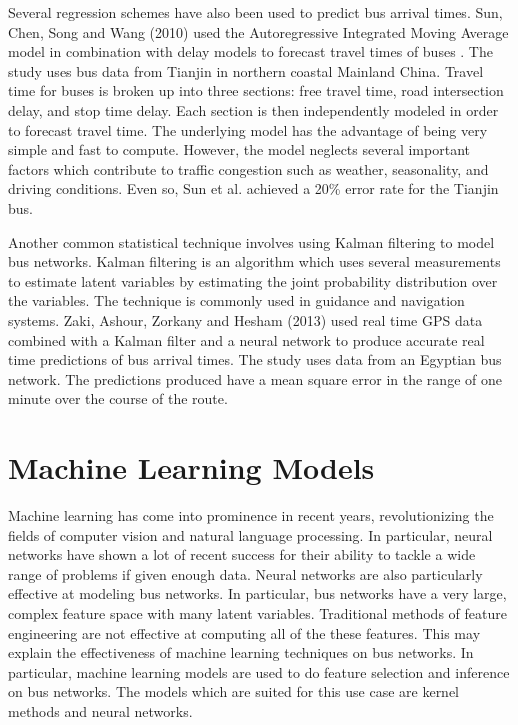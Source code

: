 Several regression schemes have also been used to predict bus arrival times.
Sun, Chen, Song and Wang (2010) used the Autoregressive Integrated Moving Average model in combination with delay models to forecast travel times of buses \cite{sun2010bus}.
The study uses bus data from Tianjin in northern coastal Mainland China.
Travel time for buses is broken up into three sections: free travel time, road intersection delay, and stop time delay.
Each section is then independently modeled in order to forecast travel time.
The underlying model has the advantage of being very simple and fast to compute.
However, the model neglects several important factors which contribute to traffic congestion such as weather, seasonality, and driving conditions.
Even so, Sun et al. achieved a 20\% error rate for the Tianjin bus.


Another common statistical technique involves using Kalman filtering to model bus networks.
Kalman filtering is an algorithm which uses several measurements to estimate latent variables by estimating the joint probability distribution over the variables.
The technique is commonly used in guidance and navigation systems.
Zaki, Ashour, Zorkany and Hesham (2013) used real time GPS data combined with a Kalman filter and a neural network to produce accurate real time predictions of bus arrival times\cite{zaki2013online}.
The study uses data from an Egyptian bus network.
The predictions produced have a mean square error in the range of one minute over the course of the route.

\section{Machine Learning Models}

Machine learning has come into prominence in recent years, revolutionizing the fields of computer vision and natural language processing.
In particular, neural networks have shown a lot of recent success for their ability to tackle a wide range of problems if given enough data.
Neural networks are also particularly effective at modeling bus networks.
In particular, bus networks have a very large, complex feature space with many latent variables.
Traditional methods of feature engineering are not effective at computing all of the these features.
This may explain the effectiveness of machine learning techniques on bus networks.
In particular, machine learning models are used to do feature selection and inference on bus networks.
The models which are suited for this use case are kernel methods and neural networks.

